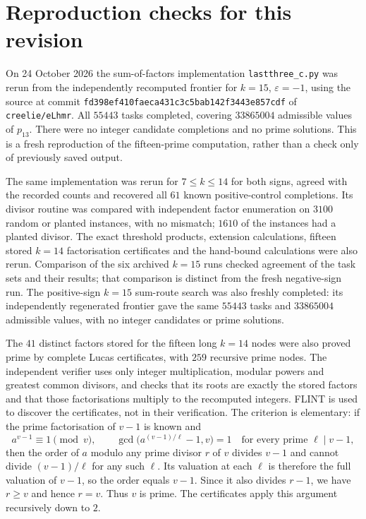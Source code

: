 \documentclass[screen,reqno]{aomart}
\numberwithin{equation}{section}
\theoremstyle{plain}
\theoremstyle{definition}
\theoremstyle{remark}
\begin{document}
\section{Reproduction checks for this revision}\label{app:revisionchecks}
On 24 October 2026 the sum-of-factors implementation
\texttt{lastthree\_c.py} was rerun from the independently recomputed
frontier for $k=15$, $\varepsilon=-1$, using the source at commit
\texttt{fd398ef410faeca431c3c5bab142f3443e857cdf} of
\texttt{creelie/eLhmr}. All $55443$ tasks completed, covering
$33865004$ admissible values of $p_{13}$. There were no integer
candidate completions and no prime solutions. This is a fresh
reproduction of the fifteen-prime computation, rather than a
check only of previously saved output.

The same implementation was rerun for $7\le k\le14$ for both
signs, agreed with the recorded counts and recovered all $61$
known positive-control completions. Its divisor routine was compared
with independent factor enumeration on $3100$ random or planted
instances, with no mismatch; $1610$ of the instances had a planted
divisor. The exact threshold products, extension calculations,
fifteen stored $k=14$ factorisation certificates and the hand-bound
calculations were also rerun. Comparison of the six archived $k=15$
runs checked agreement of the task sets and their results; that
comparison is distinct from the fresh negative-sign run.
The positive-sign $k=15$ sum-route search was also freshly completed:
its independently regenerated frontier gave the same $55443$ tasks
and $33865004$ admissible values, with no integer candidates or
prime solutions.


The $41$ distinct factors stored for the fifteen long $k=14$ nodes
were also proved prime by complete Lucas certificates, with $259$
recursive prime nodes. The independent verifier uses only integer
multiplication, modular powers and greatest common divisors, and
checks that its roots are exactly the stored factors and that those
factorisations multiply to the recomputed integers. FLINT is used to
discover the certificates, not in their verification. The criterion
is elementary: if the prime factorisation of $v-1$ is known and
\[
 a^{v-1}\equiv1\pmod v,\qquad
 \gcd\bigl(a^{(v-1)/\ell}-1,v\bigr)=1
       \quad\text{for every prime }\ell\mid v-1,
\]
then the order of $a$ modulo any prime divisor $r$ of $v$ divides
$v-1$ and cannot divide $(v-1)/\ell$ for any such $\ell$.
Its valuation at each $\ell$ is therefore the full valuation of
$v-1$, so the order equals $v-1$. Since it also divides $r-1$,
we have $r\ge v$ and hence $r=v$. Thus $v$ is prime. The
certificates apply this argument recursively down to $2$.
\end{document}
